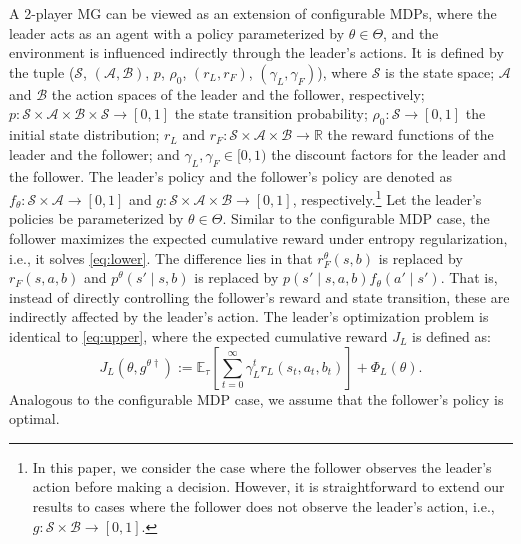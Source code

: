\documentclass[letterpaper]{article} %
\providecommand{\E}{\mathbb{E}} %
\begin{document}
A 2-player MG can be viewed as an extension of configurable MDPs, where the leader acts as an agent with a policy parameterized by $\theta \in \Theta$, and the environment is influenced indirectly through the leader's actions.
It is defined by the tuple ($\mathcal{S}$, $(\mathcal{A},\mathcal{B})$, $p$, $\rho_0$, $(r_L,r_F)$, $(\gamma_L,\gamma_F)$), where $\mathcal{S}$ is the state space; $\mathcal{A}$ and $\mathcal{B}$ the action spaces of the leader and the follower, respectively; $p: \mathcal{S}\times\mathcal{A}\times\mathcal{B}\times\mathcal{S}\to[0,1]$ the state transition probability; $\rho_0: \mathcal{S}\to[0,1]$ the initial state distribution; $r_L$ and $r_F:\mathcal{S}\times\mathcal{A}\times\mathcal{B}\to\mathbb{R}$ the reward functions of the leader and the follower; and $\gamma_L, \gamma_F \in [0, 1)$ the discount factors for the leader and the follower.
The leader's policy and the follower's policy are denoted as $f_{\theta}: \mathcal{S}\times\mathcal{A}\to[0,1]$ and $g:\mathcal{S} \times \mathcal{A}\times\mathcal{B}\to[0,1]$, respectively.\footnote{In this paper, we consider the case where the follower observes the leader's action before making a decision. However, it is straightforward to extend our results to cases where the follower does not observe the leader's action, i.e., $g:\mathcal{S} \times\mathcal{B}\to[0,1]$.}
Let the leader's policies be parameterized by ${\theta} \in \Theta$.
Similar to the configurable MDP case, the follower maximizes the expected cumulative reward under entropy regularization, i.e., it solves \eqref{eq:lower}.
The difference lies in that $r_F^{\theta}(s, b)$ is replaced by $r_F(s, a, b)$ and $p^{\theta}(s' \mid s, b)$ is replaced by $p(s' \mid s, a, b) f_{{\theta}}(a' \mid s')$.
That is, instead of directly controlling the follower's reward and state transition, these are indirectly affected by the leader's action.
The leader's optimization problem is identical to \eqref{eq:upper}, where the expected cumulative reward $J_L$ is defined as:
\begin{equation}
    J_L({\theta}, g^{\theta\dagger}) := \E_\tau\left[ \sum_{t=0}^\infty \gamma_L^t r_L(s_t, a_t, b_t)\right] + \Phi_L({\theta}). \label{eq:leader-utility-MG}
\end{equation}%
Analogous to the configurable MDP case, we assume that the follower's policy is optimal.
\end{document}
